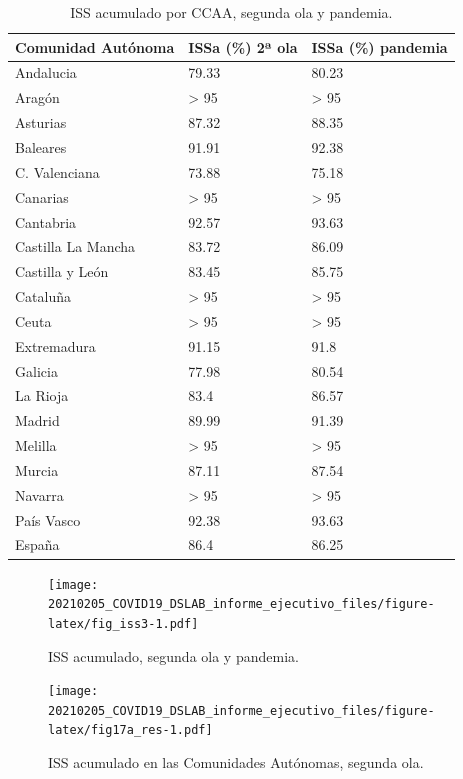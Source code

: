 \documentclass[
  11pt,
]{article}
\begin{document}
\begin{table}[!h]

\caption{\label{tab:tabla}ISS acumulado por CCAA, segunda ola y pandemia.}
\centering
\fontsize{9}{11}\selectfont
\begin{tabular}[t]{l|l|l}
\hline
Comunidad Autónoma & ISSa (\%) 2ª ola & ISSa (\%) pandemia\\
\hline
Andalucia & 79.33 & 80.23\\
\hline
Aragón & > 95 & > 95\\
\hline
Asturias & 87.32 & 88.35\\
\hline
Baleares & 91.91 & 92.38\\
\hline
C. Valenciana & 73.88 & 75.18\\
\hline
Canarias & > 95 & > 95\\
\hline
Cantabria & 92.57 & 93.63\\
\hline
Castilla La Mancha & 83.72 & 86.09\\
\hline
Castilla y León & 83.45 & 85.75\\
\hline
Cataluña & > 95 & > 95\\
\hline
Ceuta & > 95 & > 95\\
\hline
Extremadura & 91.15 & 91.8\\
\hline
Galicia & 77.98 & 80.54\\
\hline
La Rioja & 83.4 & 86.57\\
\hline
Madrid & 89.99 & 91.39\\
\hline
Melilla & > 95 & > 95\\
\hline
Murcia & 87.11 & 87.54\\
\hline
Navarra & > 95 & > 95\\
\hline
País Vasco & 92.38 & 93.63\\
\hline
España & 86.4 & 86.25\\
\hline
\end{tabular}
\end{table}

\begin{figure}
\centering
\texttt{[image: 20210205\_COVID19\_DSLAB\_informe\_ejecutivo\_files/figure-latex/fig\_iss3-1.pdf]}
\caption{\label{fig:fig_iss3} ISS acumulado, segunda ola y pandemia.}
\end{figure}

\vspace{0.2cm}

\begin{figure}
\centering
\texttt{[image: 20210205\_COVID19\_DSLAB\_informe\_ejecutivo\_files/figure-latex/fig17a\_res-1.pdf]}
\caption{\label{fig:fig17a_res} ISS acumulado en las Comunidades
Autónomas, segunda ola.}
\end{figure}
\end{document}
